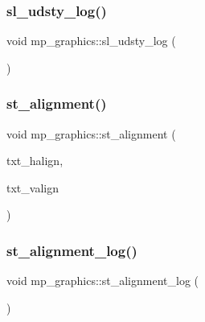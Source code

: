 \mbox{\label{classmp__graphics_ab64e78e5ca3f7432533461c116d207c5}} 
\subsubsection{\texorpdfstring{sl\+\_\+udsty\+\_\+log()}{sl\_udsty\_log()}}
{\footnotesize\ttfamily void mp\+\_\+graphics\+::sl\+\_\+udsty\+\_\+log (\begin{DoxyParamCaption}{ }\end{DoxyParamCaption})}

\mbox{\label{classmp__graphics_ab897ac847368de2da4296c7f159cc5f9}} 
\subsubsection{\texorpdfstring{st\+\_\+alignment()}{st\_alignment()}}
{\footnotesize\ttfamily void mp\+\_\+graphics\+::st\+\_\+alignment (\begin{DoxyParamCaption}\item[{\mbox{\hyperlink{galois_8h_a09fddde158a3a20bd2dcadb609de11dc}{I\+NT}}}]{txt\+\_\+halign,  }\item[{\mbox{\hyperlink{galois_8h_a09fddde158a3a20bd2dcadb609de11dc}{I\+NT}}}]{txt\+\_\+valign }\end{DoxyParamCaption})}

\mbox{\label{classmp__graphics_a9f7aa1c186791f69881ddbf590835f3e}} 
\subsubsection{\texorpdfstring{st\+\_\+alignment\+\_\+log()}{st\_alignment\_log()}}
{\footnotesize\ttfamily void mp\+\_\+graphics\+::st\+\_\+alignment\+\_\+log (\begin{DoxyParamCaption}{ }\end{DoxyParamCaption})}

